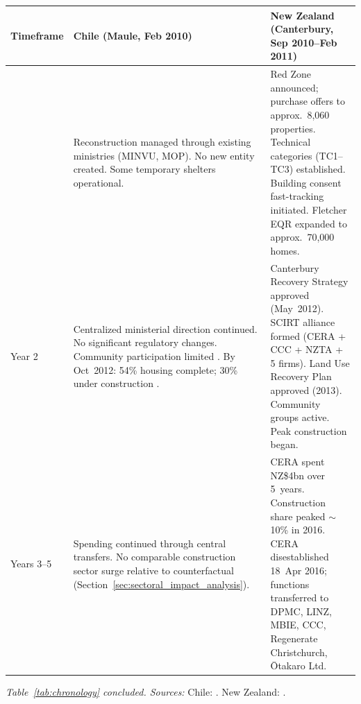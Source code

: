 \begin{table}[!htbp]
\centering
\footnotesize
\begin{tabular}{@{}
  >{\raggedright\arraybackslash}p{}
  >{\raggedright\arraybackslash}p{}
  >{\raggedright\arraybackslash}p{}
@{}}
\toprule
\textbf{Timeframe} &
\textbf{Chile (Maule, Feb 2010)} &
\textbf{New Zealand (Canterbury, Sep 2010--Feb 2011)} \\
\midrule

{Months 6--12} &
Reconstruction managed through existing ministries (MINVU, MOP). No new entity created. Some temporary shelters operational. &
Red Zone announced; purchase offers to approx.\ 8,060 properties. Technical categories (TC1--TC3) established. Building consent fast-tracking initiated. Fletcher EQR expanded to approx.\ 70,000 homes. \\
\addlinespace

{Year 2} &
Centralized ministerial direction continued. No significant regulatory changes. Community participation limited \parencite{CardenasJiron2012}. By Oct~2012: 54\% housing complete; 30\% under construction \parencite{Platt2019}. &
Canterbury Recovery Strategy approved (May~2012). SCIRT alliance formed (CERA + CCC + NZTA + 5 firms). Land Use Recovery Plan approved (2013). Community groups active. Peak construction began. \\
\addlinespace

{Years 3--5} &
Spending continued through central transfers. No comparable construction sector surge relative to counterfactual (Section~\ref{sec:sectoral_impact_analysis}). &
CERA spent NZ\$4bn over 5~years. Construction share peaked ${\sim}$10\% in 2016. CERA disestablished 18~Apr 2016; functions transferred to DPMC, LINZ, MBIE, CCC, Regenerate Christchurch, {\=O}takaro Ltd. \\

\bottomrule
\end{tabular}

\vspace{2pt}
{\scriptsize \textit{Table~\ref{tab:chronology} concluded. Sources:} Chile: \parencite{eclac2010overview,Platt2019,Comerio2013,CRS2010}. New Zealand: \parencite{AuditorGeneral2017,CERAA2011,ICNZ2024,eqc2017annual,GrubeStorr2018,Wilson2016}.}
\end{table}


